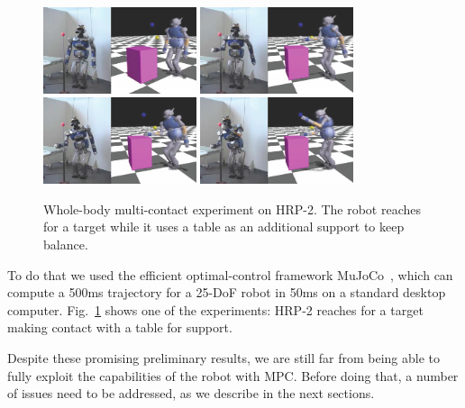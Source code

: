 \begin{figure}[!tbp]
\begin{center}
	\includegraphics[width=0.4\textwidth]{figures/mujoco/ss0.png} \quad
	\includegraphics[width=0.4\textwidth]{figures/mujoco/ss1.png} \\
	\includegraphics[width=0.4\textwidth]{figures/mujoco/ss2.png} \quad
	\includegraphics[width=0.4\textwidth]{figures/mujoco/ss3.png}
	\caption{Whole-body multi-contact experiment on HRP-2. The robot reaches for a target while it uses a table as an additional support to keep balance.}
	\label{fig:mujoco}
\end{center}
\end{figure}
To do that we used the efficient optimal-control framework MuJoCo~\citep{Todorov}, which can compute a 500ms trajectory for a 25-DoF robot in 50ms on a standard desktop computer.
Fig.~\ref{fig:mujoco} shows one of the experiments: HRP-2 reaches for a target making contact with a table for support.

Despite these promising preliminary results, we are still far from being able to fully exploit the capabilities of the robot with MPC.
Before doing that, a number of issues need to be addressed, as we describe in the next sections.

